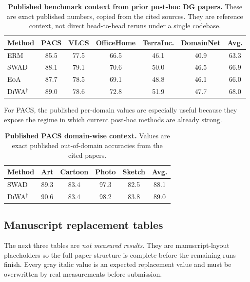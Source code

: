 \documentclass{article}
\theoremstyle{definition}
\newcommand{\swad}{\textup{\textsc{SWAD}}}
\newcommand{\diwa}{\textup{\textsc{DiWA}}}
\newcommand{\eoa}{\textup{\textsc{EoA}}}
\newcommand{\erm}{\textup{\textsc{ERM}}}
\begin{document}
\begin{table}[t]
    \centering
    \caption{\textbf{Published benchmark context from prior post-hoc DG papers.} These are exact published numbers, copied from the cited sources. They are reference context, not direct head-to-head reruns under a single codebase.}
    \label{tab:published_context}
    \begin{tabular}{lcccccc}
        \toprule
        Method & PACS & VLCS & OfficeHome & TerraInc. & DomainNet & Avg. \\
        \midrule
        \erm{} \citep{cha2021swad} & 85.5 & 77.5 & 66.5 & 46.1 & 40.9 & 63.3 \\
        \swad{} \citep{cha2021swad} & 88.1 & 79.1 & 70.6 & 50.0 & 46.5 & 66.9 \\
        \eoa{} \citep{arpit2021ensemble} & 87.7 & 78.5 & 69.1 & 48.8 & 46.1 & 66.0 \\
        \diwa{}\(^{\dagger}\) \citep{rame2022diwa} & 89.0 & 78.6 & 72.8 & 51.9 & 47.7 & 68.0 \\
        \bottomrule
    \end{tabular}
\end{table}

For PACS, the published per-domain values are especially useful because they expose the regime in which current post-hoc methods are already strong.

\begin{table}[t]
    \centering
    \caption{\textbf{Published PACS domain-wise context.} Values are exact published out-of-domain accuracies from the cited papers.}
    \label{tab:pacs_context}
    \begin{tabular}{lccccc}
        \toprule
        Method & Art & Cartoon & Photo & Sketch & Avg. \\
        \midrule
        \swad{} \citep{cha2021swad} & 89.3 & 83.4 & 97.3 & 82.5 & 88.1 \\
        \diwa{}\(^{\dagger}\) \citep{rame2022diwa} & 90.6 & 83.4 & 98.2 & 83.8 & 89.0 \\
        \bottomrule
    \end{tabular}
\end{table}

\subsection{Manuscript replacement tables}

The next three tables are \emph{not measured results}. They are manuscript-layout placeholders so the full paper structure is complete before the remaining runs finish. Every gray italic value is an expected replacement value and must be overwritten by real measurements before submission.
\end{document}
